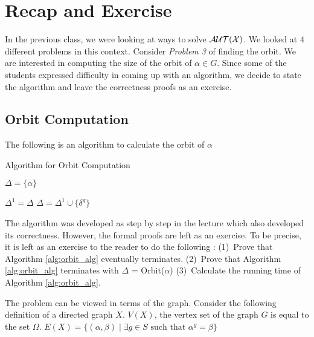 
\section{Recap and Exercise}
In the previous class, we were looking at ways to solve $\cal{AUT}(X)$.  We looked at $4$ different problems in this context. Consider \emph{Problem 3} of finding the orbit. We are interested in computing the size of the orbit of  $\alpha \in G$. Since some of the students expressed difficulty in coming up with an algorithm, we decide to state the algorithm and leave the correctness proofs as an exercise.

\subsection{Orbit Computation}
The following is an algorithm to calculate the orbit of $\alpha$

\begin{algorithm}
\caption{Algorithm for Orbit Computation}\label{orbit}
\label{alg:orbit_alg}
\begin{algorithmic}[1]
\State $\Delta = \lbrace \alpha \rbrace$

\Repeat{}
\State $\Delta^1 = \Delta$
\State $\Delta = \Delta^1 \cup \lbrace \delta^g \rbrace$
\EndFor
\Until {$\Delta^1 \neq \Delta$}
\EndProcedure
\end{algorithmic}
\end{algorithm}

The algorithm was developed as step by step in the lecture which also developed its correctness. However, the formal proofs are left as an exercise. To be precise, it is left as an exercise to the reader to do the following : (1)~Prove that Algorithm \ref{alg:orbit_alg} eventually terminates. (2)~Prove that Algorithm \ref{alg:orbit_alg} terminates with $\Delta$ = Orbit($\alpha$)
(3)~Calculate the running time of Algorithm \ref{alg:orbit_alg}.

The problem can be viewed in terms of the graph. Consider the following definition of a directed graph $X$. $V(X)$, the vertex set of the graph $G$ is equal to the set $\Omega$. 
$E(X) = \lbrace (\alpha, \beta) \mid \exists g \in S \text{ such that } \alpha^g = \beta \rbrace $

